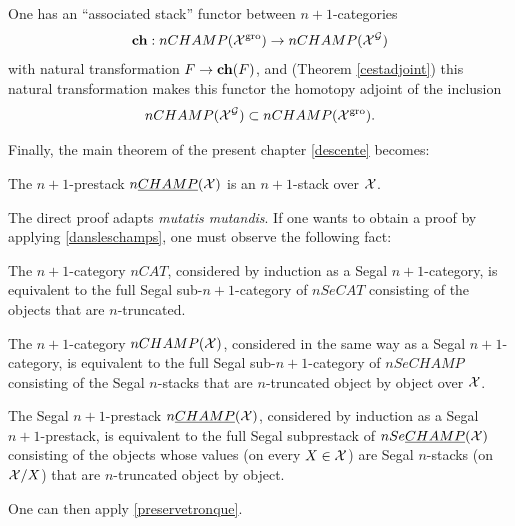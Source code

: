 One has an ``associated stack'' functor between $n+1$-categories
$$
{\bf ch} : nCHAMP ({\cal X} ^{\rm gro})\rightarrow nCHAMP ({\cal X} ^{{\cal G}})
$$
with natural transformation $F\rightarrow {\bf ch}(F)$,
and (Theorem \ref{cestadjoint}) this natural
transformation makes this functor the homotopy adjoint of the inclusion
$$
nCHAMP ({\cal X} ^{{\cal G}})\subset nCHAMP ({\cal X} ^{\rm gro}).
$$

Finally, the main theorem of the present chapter \ref{descente} becomes:

\begin{theorem}
\label{descenteNdS}
The $n+1$-prestack  $n\underline{CHAMP}({\cal X} )$ is an $n+1$-stack
over ${\cal X}$.
\end{theorem}

The direct proof adapts {\em mutatis mutandis}. If one wants to obtain a proof
by applying \ref{dansleschamps}, one must observe the following fact:

\begin{proposition}
\label{segalounon}
The $n+1$-category $nCAT$, considered
by induction as a Segal $n+1$-category, is equivalent
to the full Segal sub-$n+1$-category of $nSeCAT$ consisting
of the objects that are $n$-truncated.

The $n+1$-category $nCHAMP({\cal X} )$,
considered in the same way as a Segal $n+1$-category,
is equivalent to the full Segal sub-$n+1$-category
of
$nSeCHAMP$ consisting of the Segal $n$-stacks that are $n$-truncated
object by object over ${\cal X}$.

The Segal $n+1$-prestack $n\underline{CHAMP}({\cal X} )$,
considered by induction as a Segal $n+1$-prestack,
is equivalent to the full Segal subprestack of
$nSe\underline{CHAMP}({\cal X} )$
consisting of the objects whose values (on every $X\in {\cal X}$) are
Segal $n$-stacks (on ${\cal X}/X$) that are $n$-truncated object by object.
\end{proposition}
\eop

One can then apply \ref{preservetronque}.
\eop
